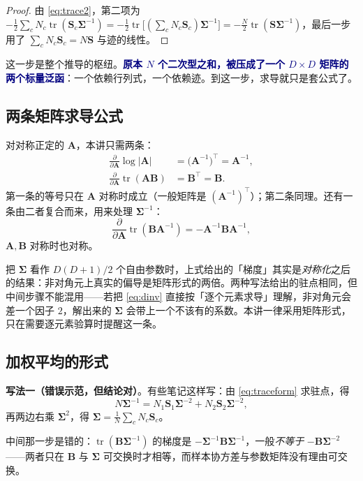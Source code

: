 \documentclass[11pt,a4paper,fontset=windows,zihao=-4]{ctexart}
\newcommand{\bA}{\mathbf{A}}
\newcommand{\bB}{\mathbf{B}}
\newcommand{\bS}{\mathbf{S}}
\newcommand{\bSigma}{\boldsymbol{\Sigma}}
\newcommand{\tp}{^{\top}}
\newcommand{\abs}[1]{\lvert #1\rvert}
\DeclareMathOperator{\tr}{tr}
\newcommand{\hl}[1]{\textcolor{navy}{\textbf{#1}}}
\begin{document}
\begin{proof}
由 \eqref{eq:trace2}，第二项为 $-\frac12\sum_c N_c\tr(\bS_c\bSigma^{-1})=-\frac12\tr\bigl[(\sum_c N_c\bS_c)\bSigma^{-1}\bigr]=-\frac N2\tr(\bS\bSigma^{-1})$，最后一步用了 $\sum_c N_c\bS_c=N\bS$ 与迹的线性。
\end{proof}

这一步是整个推导的枢纽。\hl{原本 $N$ 个二次型之和，被压成了一个 $D\times D$ 矩阵的两个标量泛函}：一个依赖行列式，一个依赖迹。到这一步，求导就只是套公式了。

\subsection{两条矩阵求导公式}

对对称正定的 $\bA$，本讲只需两条：
\begin{align}
  \frac{\partial}{\partial\bA}\log\abs{\bA}&=\bigl(\bA^{-1}\bigr)\tp=\bA^{-1},
  \label{eq:dlogdet}\\
  \frac{\partial}{\partial\bA}\tr(\bA\bB)&=\bB\tp=\bB .
  \label{eq:dtr}
\end{align}
第一条的等号只在 $\bA$ 对称时成立（一般矩阵是 $(\bA^{-1})\tp$）；第二条同理。还有一条由二者复合而来，用来处理 $\bSigma^{-1}$：
\begin{equation}
  \frac{\partial}{\partial\bA}\tr(\bB\bA^{-1})=-\bA^{-1}\bB\bA^{-1},
  \label{eq:dinv}
\end{equation}
$\bA,\bB$ 对称时也对称。

\begin{warn}
把 $\bSigma$ 看作 $D(D+1)/2$ 个自由参数时，上式给出的「梯度」其实是\emph{对称化}之后的结果：非对角元上真实的偏导是矩阵形式的两倍。两种写法给出的驻点相同，但中间步骤不能混用——若把 \eqref{eq:dinv} 直接按「逐个元素求导」理解，非对角元会差一个因子 $2$，解出来的 $\bSigma$ 会带上一个不该有的系数。本讲一律采用矩阵形式，只在需要逐元素验算时提醒这一条。
\end{warn}

\subsection{加权平均的形式}

\textbf{写法一（错误示范，但结论对）}。有些笔记这样写：由 \eqref{eq:traceform} 求驻点，得
\[
  N\bSigma^{-1}=N_1\bS_1\bSigma^{-2}+N_2\bS_2\bSigma^{-2},
\]
再两边右乘 $\bSigma^2$，得 $\bSigma=\frac1N\sum_c N_c\bS_c$。

中间那一步是错的：$\tr(\bB\bSigma^{-1})$ 的梯度是 $-\bSigma^{-1}\bB\bSigma^{-1}$，一般\emph{不等于} $-\bB\bSigma^{-2}$——两者只在 $\bB$ 与 $\bSigma$ 可交换时才相等，而样本协方差与参数矩阵没有理由可交换。
\end{document}
